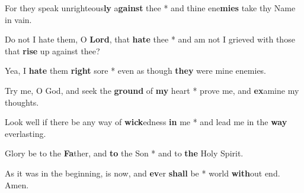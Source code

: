 \begin{multicols}{2}
	For they speak unrighteous\textbf{ly} a\textbf{gainst} thee * and thine ene\textbf{mies} take thy Name in vain.
	
	Do not I hate them, O \textbf{Lord}, that \textbf{hate} thee * and am not I grieved with those that \textbf{rise} up against thee?
	
	Yea, I \textbf{hate} them \textbf{right} sore * even as though \textbf{they} were mine enemies.
	
	Try me, O God, and seek the \textbf{ground} of \textbf{my} heart * prove me, and \textbf{ex}amine my thoughts.
	
	Look well if there be any way of \textbf{wick}edness \textbf{in} me * and lead me in the \textbf{way} everlasting.
	
	Glory be to the \textbf{Fa}ther, and \textbf{to} the Son * and to \textbf{the} Holy Spirit.
	
	As it was in the beginning, is now, and \textbf{ev}er \textbf{shall} be * world \textbf{with}out end. Amen.
\end{multicols}